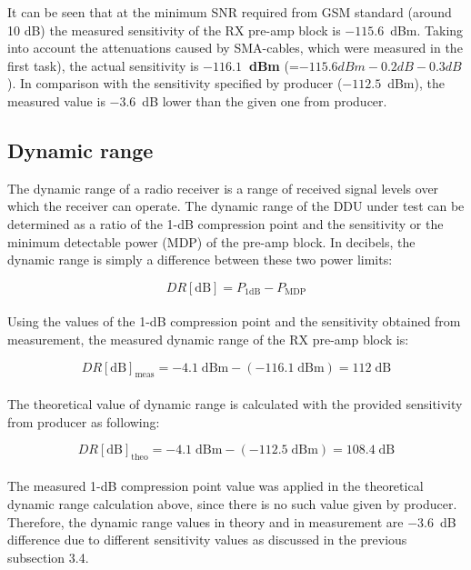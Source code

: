 \documentclass[a4paper, 12pt]{article}
\begin{document}
It can be seen that at the minimum SNR required from GSM standard (around 10 dB) the measured sensitivity of the RX pre-amp block is $-115.6$~dBm. Taking into account the attenuations caused by SMA-cables, which were measured in the first task), the actual sensitivity is \textbf{$-116.1$~dBm} (=$-115.6 dBm - 0.2 dB - 0.3 dB$). In comparison with the sensitivity specified by producer ($-112.5$~dBm), the measured value is $-3.6$~dB lower than the given one from producer.

\subsection{Dynamic range}

The dynamic range of a radio receiver is a range of received signal levels over which the receiver can operate. The dynamic range of the DDU under test can be determined as a ratio of the 1-dB compression point and the sensitivity or the minimum detectable power (MDP) of the pre-amp block. In decibels, the dynamic range is simply a difference between these two power limits:

\begin{equation}
DR[\mathrm{dB}] = P_\mathrm{1dB} - P_\mathrm{MDP} 
\end{equation}
\\

Using the values of the 1-dB compression point and the sensitivity obtained from measurement, the measured dynamic range of the RX pre-amp block is:

\begin{equation}
DR[\mathrm{dB}]_\mathrm{meas} = -4.1 \mathrm{\;dBm} - (-116.1 \mathrm{\;dBm}) = 112 \mathrm{\;dB}
\end{equation}
\\

The theoretical value of dynamic range is calculated with the provided sensitivity from producer as following:

\begin{equation}
DR[\mathrm{dB}]_\mathrm{theo} = -4.1 \mathrm{\;dBm} - (-112.5 \mathrm{\;dBm}) = 108.4 \mathrm{\;dB}
\end{equation}
\\

The measured 1-dB compression point value was applied in the theoretical dynamic range calculation above, since there is no such value given by producer. Therefore, the dynamic range values in theory and in measurement are $-3.6$~dB difference due to different sensitivity values as discussed in the previous subsection 3.4.
\end{document}
